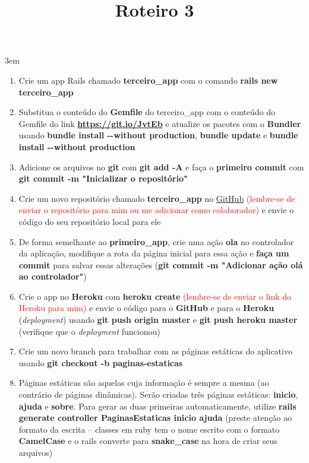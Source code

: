 \documentclass[a4paper,12pt]{article}
\title{Roteiro 3}
\begin{document}
\maketitle

\emergencystretch 3em

\setlength{\leftmargini}{0pt}
\begin{enumerate}
  \item Crie um app Rails chamado \textbf{terceiro\_app} com o comando \textbf{rails new terceiro\_app}
  \item Substitua o conteúdo do \textbf{Gemfile} do terceiro\_app com o conteúdo do Gemfile do link \textbf{\href{https://git.io/JvtEb}{https://git.io/JvtEb}} e atualize os pacotes com o \textbf{Bundler} usando \textbf{bundle install {-}-without production}, \textbf{bundle update} e \textbf{bundle install {-}-without production}
  \item Adicione os arquivos no \textbf{git} com \textbf{git add -A} e faça o \textbf{primeiro commit} com \textbf{git commit -m "Inicializar o repositório"}
  \item Crie um novo repositório chamado \textbf{terceiro\_app} no \href{https://www.github.com}{GitHub} \textcolor{red}{(lembre-se de enviar o repositório para mim ou me adicionar como colaborador)} e envie o código do seu repositório local para ele
  \item De forma semelhante ao \textbf{primeiro\_app}, crie uma ação \textbf{ola} no controlador da aplicação, modifique a rota da página inicial para essa ação e \textbf{faça um commit} para salvar essas alterações (\textbf{git commit -m "Adicionar ação olá ao controlador"})
  \item Crie o app no \textbf{Heroku} com \textbf{heroku create} \textcolor{red}{(lembre-se de enviar o link do Heroku para mim)} e envie o código para o \textbf{GitHub} e para o \textbf{Heroku} (\textit{deployment}) usando \textbf{git push origin master} e \textbf{git push heroku master} (verifique que o \textit{deployment} funcionou)
  \item Crie um novo branch para trabalhar com as páginas estáticas do aplicativo usando \textbf{git checkout -b paginas-estaticas}
  \item Páginas estáticas são aquelas cuja informação é sempre a mesma (ao contrário de páginas dinâmicas). Serão criadas três páginas estáticas: \textbf{inicio}, \textbf{ajuda} e \textbf{sobre}. Para gerar as duas primeiras automaticamente, utilize \textbf{rails generate controller PaginasEstaticas inicio ajuda} (preste atenção ao formato da escrita -- classes em ruby tem o nome escrito com o formato \textbf{CamelCase} e o rails converte para \textbf{snake\_case} na hora de criar seus arquivos)

\end{enumerate}
\end{document}
